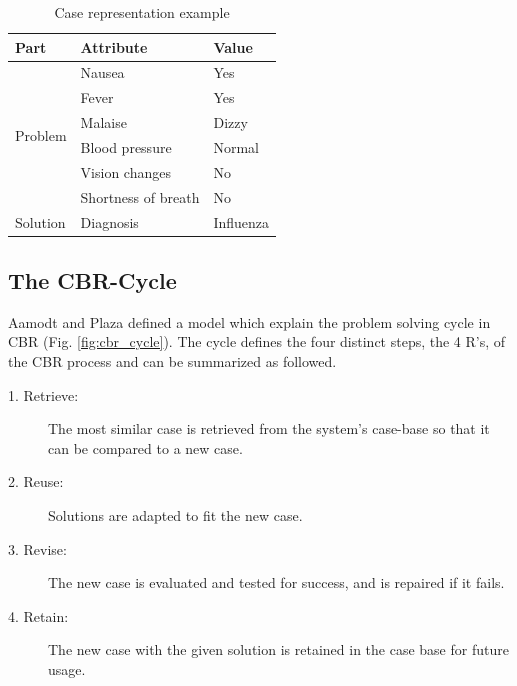 \begin{table}[h]
\centering
\caption{Case representation example}
\label{tab:example_case}
\begin{tabular}{|l|l|l|}

\hline
 \textbf{Part} & \textbf{Attribute} & \textbf{Value} \\ \hline \hline
\multicolumn{1}{|l|}{\multirow{6}{*}{Problem}} & Nausea & Yes \\ \cline{2-3} 
\multicolumn{1}{|l|}{} & Fever & Yes \\ \cline{2-3} 
\multicolumn{1}{|l|}{} & Malaise & Dizzy \\ \cline{2-3} 
\multicolumn{1}{|l|}{} & Blood pressure & Normal \\ \cline{2-3} 
\multicolumn{1}{|l|}{} & Vision changes & No \\ \cline{2-3} 
\multicolumn{1}{|l|}{} & Shortness of breath & No \\ \hline
\multicolumn{1}{|l|}{Solution} & Diagnosis & Influenza \\ \hline
\end{tabular}
\end{table}

\subsection{The CBR-Cycle}\label{sec:cbr-cycle}

Aamodt and Plaza \cite{aamodt1994case} defined a model which explain the problem solving cycle in CBR (Fig. \ref{fig:cbr_cycle}). The cycle defines the four distinct steps, the 4 R's, of the CBR process and can be summarized as followed.

\begin{description}
\item [1. Retrieve:] The most similar case is retrieved from the system's case-base so that it can be compared to a new case.
\item [2. Reuse:] Solutions are adapted to fit the new case.
\item [3. Revise:] The new case is evaluated and tested for success, and is repaired if it fails.
\item [4. Retain:] The new case with the given solution is retained in the case base for future usage.
\end{description}

